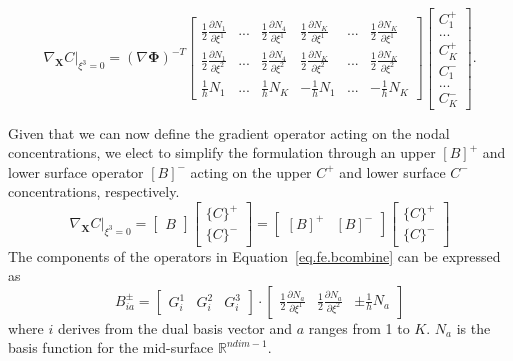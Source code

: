 \documentclass[10pt]{elsarticle}
\newcommand{\mbs}[1]{\boldsymbol{#1}}
\def\bs{{\mbs{s}}} \def\bt{{\mbs{t}}} \def\bu{{\mbs{u}}}
\def\bPhi{{\mbs{\Phi}}}
\def\bs{\boldsymbol}
\begin{document}
\begin{equation}
\label{eq.fe.grad.expand} \nabla_{\bs{X}} C\big|_{\xi^{3} = 0} = (\nabla \bPhi)^{-T} 
\begin{bmatrix} \frac{1}{2}\frac{\partial N_{1}}{\partial \xi^{1}} &  ...  &  \frac{1}{2}\frac{\partial N_{4}}{\partial \xi^{1}} & \frac{1}{2}\frac{\partial N_{K}}{\partial \xi^{1}}  & ... & \frac{1}{2}\frac{\partial N_{K}}{\partial \xi^{1}} \\
 \frac{1}{2}\frac{\partial N_{1}}{\partial \xi^{2}} &  ...  &  \frac{1}{2}\frac{\partial N_{4}}{\partial \xi^{2}}  & \frac{1}{2}\frac{\partial N_{K}}{\partial \xi^{2}}  & ... & \frac{1}{2}\frac{\partial N_{K}}{\partial \xi^{2}} \\
  \frac{1}{h} N_{1} &  ...  &   \frac{1}{h} N_{K}  &  -\frac{1}{h} N_{1} & ... &  -\frac{1}{h} N_{K} \end{bmatrix}
  \begin{bmatrix} C_{1}^{+} \\ ... \\ C_{K}^{+} \\ C_{1}^{-} \\ ... \\ C_{K}^{-}  \end{bmatrix}.
\end{equation}

Given that we can now define the gradient operator acting on the nodal concentrations, we elect to simplify the formulation through an upper $[B]^{+}$ and lower surface operator $[B]^{-}$  acting on the upper ${C}^{+}$ and lower surface ${C}^{-}$ concentrations, respectively.
\begin{equation}
\label{eq.fe.bcombine} \nabla_{\bs{X}} C\big|_{\xi^{3} = 0} = 
\begin{bmatrix} B \end{bmatrix}
\begin{bmatrix} \{C\}^{+} \\ \{C\}^{-} \end{bmatrix} =
\begin{bmatrix} [B]^{+} & [B]^{-} \end{bmatrix}
\begin{bmatrix} \{C\}^{+} \\ \{C\}^{-} \end{bmatrix}
\end{equation}
The components of the operators in Equation~\eqref{eq.fe.bcombine} can be expressed as 
\begin{equation}
\label{eq.fe.bcomponents.plus} B^{\pm}_{ia} = \begin{bmatrix} G^{1}_{i} & G^{2}_{i} & G^{3}_{i} \end{bmatrix} \cdot  \begin{bmatrix} \frac{1}{2}\frac{\partial N_{a}}{\partial \xi^{1}} & \frac{1}{2}\frac{\partial N_{a}}{\partial \xi^{2}}  &  \pm \frac{1}{h} N_{a} \end{bmatrix}
\end{equation}
where  $i$ derives from the dual basis vector and $a$ ranges from 1 to $K$. $N_{a}$ is the basis function for the mid-surface $\mathbb{R}^{ndim-1}$.
\end{document}

